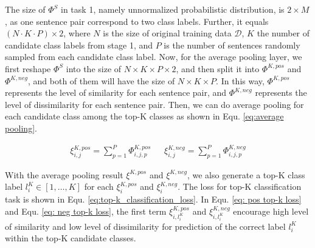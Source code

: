 The size of ${\Phi}^S$ in task 1, namely unnormalized probabilistic distribution, is $2 \times M$, as one sentence pair correspond to two class labels.
Further, it equals $(N\cdot K\cdot P)\times 2$, where $N$ is the size of original training data $\mathcal{D}$, $K$ the number of candidate class labels from stage 1, and $P$ is the number of sentences randomly sampled from each candidate class label. 
Now, for the average pooling layer, we first reshape ${\Phi}^S$ into the size of $N\times K\times P\times 2$, and then split it into ${\Phi}^{K,pos}$ and ${\Phi}^{K,neg}$, and both of them will have the size of $N\times K\times P$. 
In this way, ${\Phi}^{K,pos}$ represents the level of similarity for each sentence pair, and ${\Phi}^{K,neg}$ represents the level of dissimilarity for each sentence pair. 
Then, we can do average pooling for each candidate class among the top-K classes as shown in Equ. \ref{eq:average pooling}.

\vspace{-2em}
\begin{align}
  {\xi}_{i,j}^{K,pos} = \sum_{p=1}^{P}{\varPhi}_{i,j,p}^{K,pos} \ \ \ \ \ \ \ 
  {\xi}_{i,j}^{K,neg} = \sum_{p=1}^{P}{\varPhi}_{i,j,p}^{K,neg}
  \label{eq:average pooling}
\end{align}

With the average pooling result ${\xi}^{K,pos}$ and ${\xi}^{K,neg}$, we also
generate a top-K class label $l^{K}_i\in [1,\dots,K]$ for each
${\xi}^{K,pos}_{i}$ and ${\xi}^{K,neg}_{i}$. The loss for top-K classification
task is shown in Equ. \ref{eq:top-k_classification_loss}. In Equ. \ref{eq: pos
top-k loss} and Equ. \ref{eq: neg top-k loss}, the first term
$\xi_{i,l^{K}_{i}}^{K,pos}$ and $\xi_{i,l^{K}_{i}}^{K,neg}$ encourage high
level of similarity and low level of dissimilarity for prediction of the
correct label $l^{K}_i$ within the top-K candidate classes.

